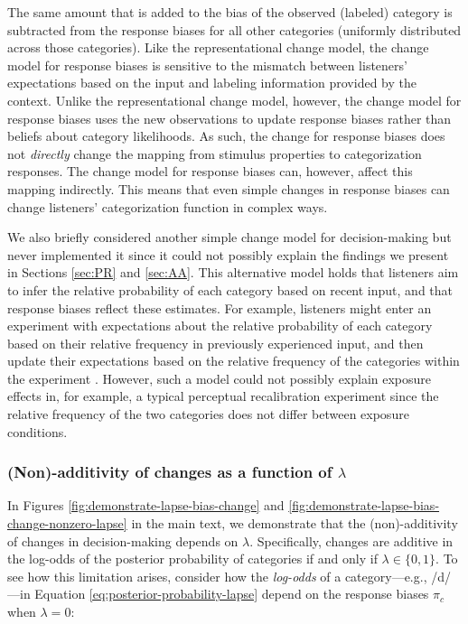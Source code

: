 \documentclass[
  11pt,
  man,floatsintext]{apa6}
\begin{document}
The same amount that is added to the bias of the observed (labeled) category is subtracted from the response biases for all other categories (uniformly distributed across those categories).
Like the representational change model, the change model for response biases is sensitive to the mismatch between listeners' expectations based on the input and labeling information provided by the context. Unlike the representational change model, however, the change model for response biases uses the new observations to update response biases rather than beliefs about category likelihoods. As such, the change for response biases does not \emph{directly} change the mapping from stimulus properties to categorization responses. The change model for response biases can, however, affect this mapping indirectly. This means that even simple changes in response biases can change listeners' categorization function in complex ways.

We also briefly considered another simple change model for decision-making but never implemented it since it could not possibly explain the findings we present in Sections \ref{sec:PR} and \ref{sec:AA}. This alternative model holds that listeners aim to infer the relative probability of each category based on recent input, and that response biases reflect these estimates. For example, listeners might enter an experiment with expectations about the relative probability of each category based on their relative frequency in previously experienced input, and then update their expectations based on the relative frequency of the categories within the experiment \autocites[similar to belief-updating models of syntactic adaptation,][]{fine-jaeger2013,jaeger2019,prasad2021}. However, such a model could not possibly explain exposure effects in, for example, a typical perceptual recalibration experiment since the relative frequency of the two categories does not differ between exposure conditions.

\hypertarget{sec:consequences-of-lambda}{%
\subsubsection{\texorpdfstring{(Non)-additivity of changes as a function of \(\lambda\)}{(Non)-additivity of changes as a function of \textbackslash lambda}}\label{sec:consequences-of-lambda}}

In Figures \ref{fig:demonstrate-lapse-bias-change} and \ref{fig:demonstrate-lapse-bias-change-nonzero-lapse} in the main text, we demonstrate that the (non)-additivity of changes in decision-making depends on \(\lambda\). Specifically, changes are additive in the log-odds of the posterior probability of categories if and only if \(\lambda \in \{0, 1\}\). To see how this limitation arises, consider how the \emph{log-odds} of a category---e.g., /d/---in Equation \eqref{eq:posterior-probability-lapse} depend on the response biases \(\pi_c\) when \(\lambda=0\):
\end{document}
